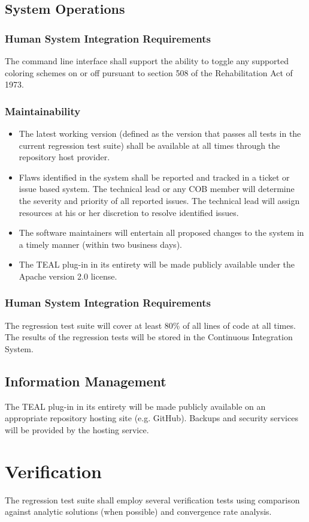 \subsection{System Operations}
\subsubsection{Human System Integration Requirements}
The command line interface shall support the ability to toggle any supported coloring schemes on or off pursuant to section 
508 of the Rehabilitation Act of 1973.
\subsubsection{Maintainability}
\begin{itemize}
  \item The latest working version (defined as the version that passes all tests in the current regression test suite) shall be 
            available at all times through the repository host provider.
  \item  Flaws identified in the system shall be reported and tracked in a ticket or issue based system. The technical lead or 
            any COB member will 
            determine the severity and priority of all reported issues. The technical lead will assign resources at his or her 
            discretion to resolve identified issues.
  \item  The software maintainers will entertain all proposed changes to the system in a timely manner 
           (within two business days).        
  \item  The TEAL plug-in in its entirety will be made publicly available under the Apache version 2.0 license.
%
%
\end{itemize}
\subsubsection{Human System Integration Requirements}
The regression test suite will cover at least 80\% of all lines of code at all times. 
The results of the regression tests will be stored in the Continuous Integration System.

\subsection{Information Management}
The TEAL plug-in in its entirety will be made publicly available on an appropriate repository hosting site (e.g. GitHub).
Backups and security services will be provided by the hosting service.
%
%

\section{Verification}
The regression test suite shall employ several verification tests using comparison against analytic 
solutions (when possible) and convergence rate analysis. 
